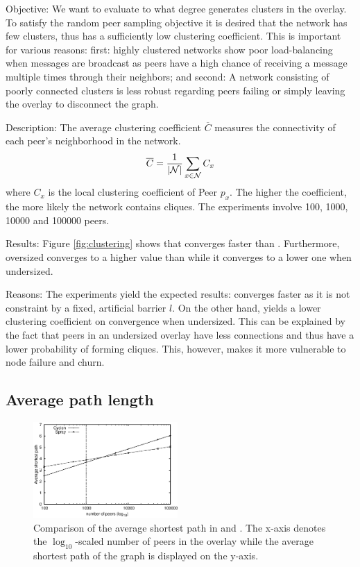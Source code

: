 \begin{asparadesc}
\item[Objective:] We want to evaluate to what degree \SPRAY{} generates
  clusters in the overlay.  To satisfy the random peer sampling objective it is
  desired that the network has few clusters, thus has a sufficiently low
  clustering coefficient.  This is important for various reasons: first: highly
  clustered networks show poor load-balancing when messages are broadcast as
  peers have a high chance of receiving a message multiple times through their
  neighbors; and second: A network consisting of poorly connected clusters is
  less robust regarding peers failing or simply leaving the overlay to
  disconnect the graph.
\item[Description:] The average clustering coefficient $\overline{C}$ measures
  the connectivity of each peer's neighborhood in the network.
  \begin{equation}
    \overline{C} = {1\over |\mathcal{N}|}\sum\limits_{x\in\mathcal{N}}C_x
  \end{equation}
  where $C_x$ is the local clustering coefficient of Peer $p_x$. The higher the
  coefficient, the more likely the network contains cliques.  The experiments
  involve 100, 1000, 10000 and 100000 peers.
\item[Results:] Figure \ref{fig:clustering} shows that \SPRAY{} converges
  faster than \CYCLON{}.  Furthermore, oversized \CYCLON{} converges to a
  higher value than \SPRAY while it converges to a lower one when
  undersized.
\item[Reasons:] The experiments yield the expected results: \SPRAY{}
  converges faster as it is not constraint by a fixed, artificial barrier
  $l$.  On the other hand, \CYCLON{} yields a lower clustering coefficient on
  convergence when undersized.  This can be explained by the fact that peers in
  an undersized \CYCLON{} overlay have less connections and thus have a lower
  probability of forming cliques.  This, however, makes it more vulnerable to
  node failure and churn.
\end{asparadesc}

\subsection{Average path length}
\label{subsec:avg}
\begin{figure}
  \centering
  \includegraphics[width=0.49\textwidth]{img/avgpath.eps}
  \caption{\label{fig:avgpath}Comparison of the average shortest path in \SPRAY{}
      and \CYCLON{}. The x-axis denotes the $\log_{10}$-scaled number of peers in 
      the overlay while the average shortest path of the graph is displayed on the 
  y-axis.}
\end{figure}

